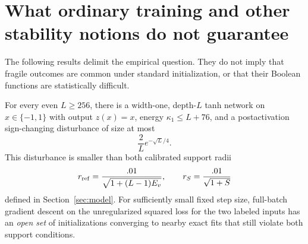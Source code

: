 \section{What ordinary training and other stability notions do not guarantee}
\label{sec:naturalness-obstructions}

The following results delimit the empirical question. They do not imply
that fragile outcomes are common under standard initialization, or that
their Boolean functions are statistically difficult.

\begin{proposition}
For every even $L\ge256$, there is a width-one, depth-$L$ tanh network
on $x\in\{-1,1\}$ with output $z(x)=x$, energy $\kappa_1\le L+76$,
and a postactivation sign-changing disturbance of size at most
\[
 \frac2L e^{-\sqrt L/4}.
\]
This disturbance is smaller than both calibrated support radii
\[
 r_{\rm ref}=\frac{.01}{\sqrt{1+(L-1)E_v}},\qquad
 r_S=\frac{.01}{\sqrt{1+S}}
\]
defined in Section~\ref{sec:model}.
For sufficiently small fixed step size, full-batch gradient descent on
the unregularized squared loss for the two labeled inputs has an
\emph{open set} of initializations converging to nearby exact fits that
still violate both support conditions.
\end{proposition}

